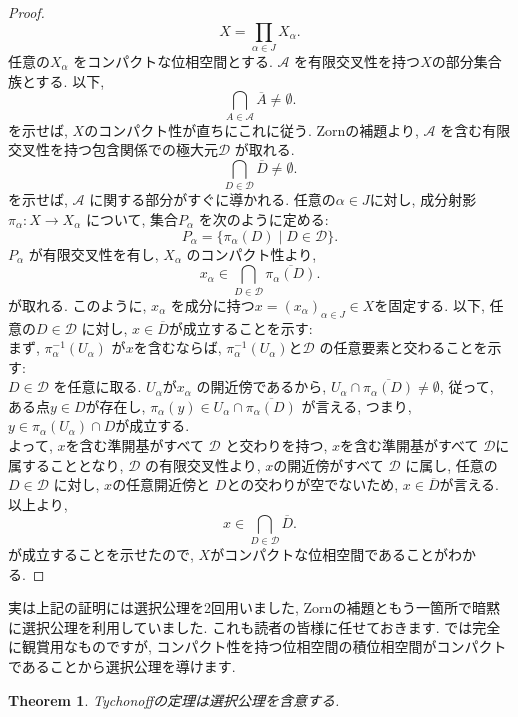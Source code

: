 \documentclass[lualatex]{ltjsbook}
\newcommand{\cl}[1]{\overline{ #1}  }
\newtheorem{theorem}{Theorem}[chapter]
\theoremstyle{remark}
\theoremstyle{plain}
\begin{document}
\begin{proof}
	\[
	X = \prod_{\alpha \in J} X_{\alpha}  
	.\] 
	任意の$X_{\alpha}$ をコンパクトな位相空間とする. $\mathcal{A}$ を有限交叉性を持つ$X$の部分集合族とする. 以下, 
	 \[
	 \bigcap_{A \in \mathcal{A}} \cl{A} \neq \emptyset
	 .\] 
	 を示せば,  $X$のコンパクト性が直ちにこれに従う.
	 Zornの補題より,  $\mathcal{A}$ を含む有限交叉性を持つ包含関係での極大元$\mathcal{D}$ が取れる. 
	 \[
		 \bigcap_{D \in  \mathcal{D}} \cl{D} \neq \emptyset
	 .\] 
	 を示せば,  $\mathcal{A}$ に関する部分がすぐに導かれる.
	 任意の$\alpha \in  J$に対し,  成分射影$\pi_{\alpha}: X \to X _{\alpha}$ について,  集合$P_{\alpha}$ を次のように定める: 
	 \[
	 P_{\alpha }= \{\pi_{\alpha} \left( D \right)  \mid  D \in \mathcal{D}\} 
	 .\] 
	 $P_{\alpha}$ が有限交叉性を有し,  $X_{\alpha}$ のコンパクト性より,  
	  \[
		  x_{\alpha} \in \bigcap_{D \in \mathcal{D}} \cl{\pi_{\alpha}(D)}
	 .\] 
	 が取れる.
 このように,  $x_{\alpha}$ を成分に持つ$x = \left( x_{\alpha} \right) _{\alpha \in  J} \in X$を固定する.
 以下,  任意の$D \in \mathcal{D}$ に対し,  $x \in \cl{D}$が成立することを示す:\\
 まず,   $\pi_{\alpha}^{-1}(U_{\alpha})$ が$x$を含むならば,   $\pi_{\alpha}^{-1}(U_{\alpha})$と$\mathcal{D}$ の任意要素と交わることを示す:\\
  $D \in  \mathcal{D}$ を任意に取る. $U _{\alpha}$が$x _{\alpha}$ の開近傍であるから,  
  $U_{\alpha} \cap \cl{\pi_{\alpha}{(D)}} \neq \emptyset$,  従って,  ある点$y \in D$が存在し,   $\pi_{\alpha} (y) \in U_{\alpha} \cap \cl{\pi_{\alpha}{(D)}}$ が言える,  つまり,  $y \in \pi_{\alpha}(U_{\alpha}) \cap D$が成立する.\\
  よって,  $x$を含む準開基がすべて $\mathcal{D}$ と交わりを持つ,  $x$を含む準開基がすべて $\mathcal{D}$に属することとなり,  $\mathcal{D}$ の有限交叉性より,  $x$の開近傍がすべて $\mathcal{D}$ に属し,  任意の$D \in \mathcal{D}$ に対し,  $x$の任意開近傍と $D$との交わりが空でないため,   $x \in \cl{D}$が言える.
  以上より,  
   \[
	   x \in \bigcap_{D \in \mathcal{D}} \cl{D} 
  .\] 
  が成立することを示せたので,  $X$がコンパクトな位相空間であることがわかる.

\end{proof}

実は上記の証明には選択公理を2回用いました,  Zornの補題ともう一箇所で暗黙に選択公理を利用していました. これも読者の皆様に任せておきます. では完全に観賞用なものですが,  コンパクト性を持つ位相空間の積位相空間がコンパクトであることから選択公理を導けます.

\begin{theorem}
	Tychonoffの定理は選択公理を含意する.
\end{theorem}
\end{document}
